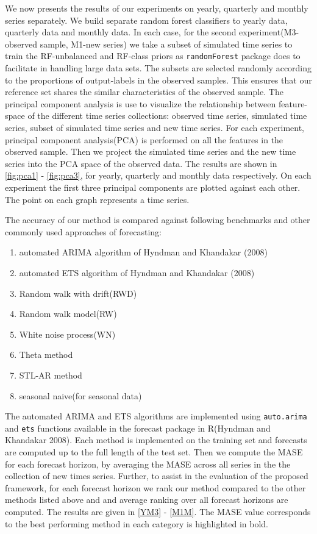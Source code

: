 \documentclass[11pt,]{article}
\theoremstyle{definition}
\theoremstyle{definition}
\theoremstyle{definition}
\theoremstyle{remark}
\begin{document}
We now presents the results of our experiments on yearly, quarterly and
monthly series separately. We build separate random forest classifiers
to yearly data, quarterly data and monthly data. In each case, for the
second experiment(M3-observed sample, M1-new series) we take a subset of
simulated time series to train the RF-unbalanced and RF-class priors as
\texttt{randomForest} package does to facilitate in handling large data
sets. The subsets are selected randomly according to the proportions of
output-labels in the observed samples. This ensures that our reference
set shares the similar characteristics of the observed sample. The
principal component analysis is use to visualize the relationship
between feature-space of the different time series collections: observed
time series, simulated time series, subset of simulated time series and
new time series. For each experiment, principal component analysis(PCA)
is performed on all the features in the observed sample. Then we project
the simulated time series and the new time series into the PCA space of
the observed data. The results are shown in \autoref{fig:pca1} -
\autoref{fig:pca3}, for yearly, quarterly and monthly data respectively.
On each experiment the first three principal components are plotted
against each other. The point on each graph represents a time series.

The accuracy of our method is compared against following benchmarks and
other commonly used approaches of forecasting:

\begin{enumerate}
\def\labelenumi{\arabic{enumi}.}
\item
  automated ARIMA algorithm of Hyndman and Khandakar (2008)
\item
  automated ETS algorithm of Hyndman and Khandakar (2008)
\item
  Random walk with drift(RWD)
\item
  Random walk model(RW)
\item
  White noise process(WN)
\item
  Theta method
\item
  STL-AR method
\item
  seasonal naive(for seasonal data)
\end{enumerate}

The automated ARIMA and ETS algorithms are implemented using
\texttt{auto.arima} and \texttt{ets} functions available in the forecast
package in R(Hyndman and Khandakar 2008). Each method is implemented on
the training set and forecasts are computed up to the full length of the
test set. Then we compute the MASE for each forecast horizon, by
averaging the MASE across all series in the the collection of new times
series. Further, to assist in the evaluation of the proposed framework,
for each forecast horizon we rank our method compared to the other
methods listed above and and average ranking over all forecast horizons
are computed. The results are given in \autoref{YM3} - \autoref{M1M}.
The MASE value corresponds to the best performing method in each
category is highlighted in bold.
\end{document}
